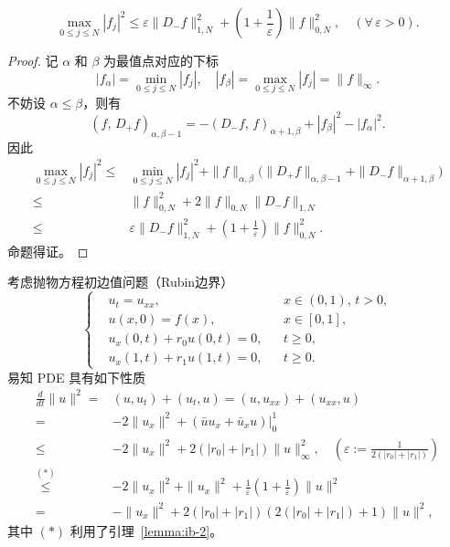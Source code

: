 \begin{lemma}\label{lemma:ib-3}
    \[
        \max_{0 \le j \le N} |f_j|^2 \le \varepsilon \|D_- f\|_{1,N}^2
        + \left(1 + \frac{1}{\varepsilon}\right) \|f\|_{0,N}^2,\quad (\forall\,\varepsilon > 0).
    \]
\end{lemma}

\begin{proof}
    记 $\alpha$ 和 $\beta$ 为最值点对应的下标
    \[
        |f_\alpha| = \min_{0 \le j \le N} |f_j|, \quad
        |f_\beta| = \max_{0 \le j \le N} |f_j| = \|f\|_{\infty}.
    \]
    不妨设 $\alpha \le \beta$，则有
    \[
        (f,\,D_+ f)_{\alpha,\beta-1} = -(D_-f,\,f)_{\alpha+1,\beta} + |f_\beta|^2 - |f_\alpha|^2.
    \]
    因此
    \begin{align*}
        \max_{0 \le j \le N} |f_j|^2 \le{} & \min_{0 \le j \le N} |f_j|^2
        + \|f\|_{\alpha,\beta} \Big( \| D_+ f \|_{\alpha,\beta-1} + \| D_- f \|_{\alpha+1,\beta} \Big)                   \\
        \le{}                              & \|f\|_{0,N}^2 + 2 \|f\|_{0,N} \| D_- f \|_{1,N}                             \\
        \le{}                              & \varepsilon \| D_- f \|_{1,N}^2 + \left(1 + \frac{1}{\varepsilon}\right) \|f\|_{0,N}^2.
    \end{align*}
    命题得证。
\end{proof}

考虑抛物方程初边值问题（Rubin边界）
\[
    \left\{
    \begin{aligned}
         & u_t = u_{xx},              &  & x \in (0,1),\, t > 0, \\
         & u(x,0) = f(x),             &  & x \in [0,1],          \\
         & u_x(0,t) + r_0 u(0,t) = 0, &  & t \ge 0,              \\
         & u_x(1,t) + r_1 u(1,t) = 0, &  & t \ge 0.
    \end{aligned}
    \right.
\]
易知 PDE 具有如下性质
\begin{align*}
    \frac{d}{dt}\|u\|^2
    ={}                  & (u,u_t) + (u_t,u) = (u,u_{xx}) + (u_{xx},u)
    \\
    ={}                  & -2 \|u_x\|^2 + (\bar{u} u_x + \bar{u}_x u) \big|_0^1
    \\
    \le{}                & -2 \|u_x\|^2 + 2(|r_0|+|r_1|) \|u\|_{\infty}^2,\quad \left(\varepsilon := \frac{1}{2(|r_0|+|r_1|)}\right)
    \\
    \overset{(*)}{\le}{} & - 2 \|u_x\|^2 + \|u_x\|^2 + \frac{1}{\varepsilon} (1 + \frac{1}{\varepsilon}) \|u\|^2
    \\
    ={}                  & -  \|u_x\|^2 + 2(|r_0|+|r_1|)(2(|r_0|+|r_1|)+1)\|u\|^2,
\end{align*}
其中 $(*)$ 利用了引理~\ref{lemma:ib-2}。

